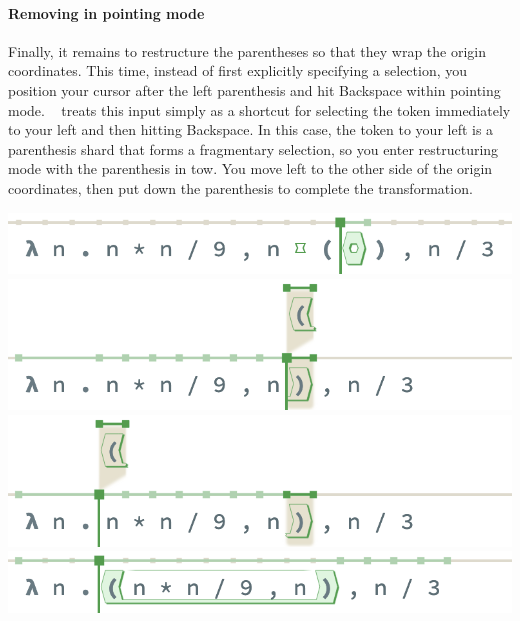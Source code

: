 

\paragraph{Removing in pointing mode}
Finally, it remains to restructure the parentheses
so that they wrap the origin coordinates.
This time, instead of first explicitly specifying a selection,
you position your cursor after the left parenthesis
and hit Backspace within pointing mode.
\tylr~ treats this input simply as a shortcut for selecting the
token immediately to your left and then hitting Backspace.
In this case, the token to your left is a parenthesis
shard that forms a fragmentary selection, so you
enter restructuring mode with the parenthesis in tow.
You move left to the other side of the origin coordinates,
then put down the parenthesis to complete the transformation.
\begin{center}
  \includegraphics[width=0.6\columnwidth]{img/remove-pointing-0.png}
  \includegraphics[width=0.6\columnwidth]{img/remove-pointing-1.png}
  \includegraphics[width=0.6\columnwidth]{img/remove-pointing-2.png}
  \includegraphics[width=0.6\columnwidth]{img/remove-pointing-3.png}
\end{center}

